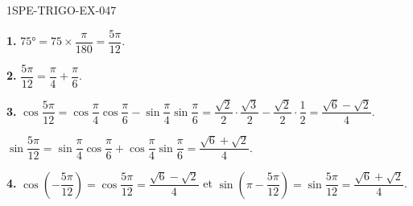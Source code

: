 \begin{corrige}{1SPE-TRIGO-EX-047}

\textbf{1.} $75° = 75 \times \dfrac{\pi}{180} = \dfrac{5\pi}{12}$.

\textbf{2.} $\dfrac{5\pi}{12} = \dfrac{\pi}{4} + \dfrac{\pi}{6}$.

\textbf{3.} $\cos\dfrac{5\pi}{12} = \cos\dfrac{\pi}{4}\cos\dfrac{\pi}{6} - \sin\dfrac{\pi}{4}\sin\dfrac{\pi}{6} = \dfrac{\sqrt{2}}{2}\cdot\dfrac{\sqrt{3}}{2} - \dfrac{\sqrt{2}}{2}\cdot\dfrac{1}{2} = \dfrac{\sqrt{6}-\sqrt{2}}{4}$.

$\sin\dfrac{5\pi}{12} = \sin\dfrac{\pi}{4}\cos\dfrac{\pi}{6} + \cos\dfrac{\pi}{4}\sin\dfrac{\pi}{6} = \dfrac{\sqrt{6}+\sqrt{2}}{4}$.

\textbf{4.} $\cos\!\left(-\dfrac{5\pi}{12}\right) = \cos\dfrac{5\pi}{12} = \dfrac{\sqrt{6}-\sqrt{2}}{4}$ et $\sin\!\left(\pi-\dfrac{5\pi}{12}\right) = \sin\dfrac{5\pi}{12} = \dfrac{\sqrt{6}+\sqrt{2}}{4}$.

\end{corrige}
